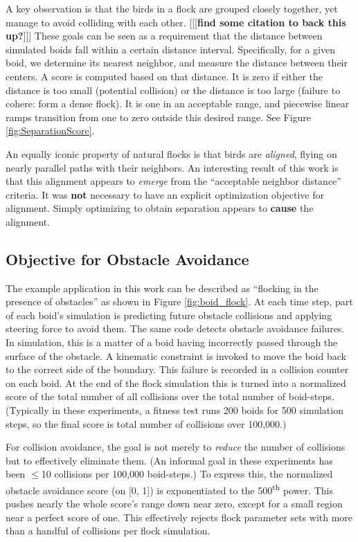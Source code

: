 \documentclass[letterpaper]{article}
\begin{document}
A key observation is that the birds in a flock are grouped closely together, yet manage to avoid colliding with each other. [[[\textbf{find some citation to back this up?}]]] These goals can be seen as a requirement that the distance between simulated boids fall within a certain distance interval. Specifically, for a given boid, we determine its nearest neighbor, and measure the distance between their centers. A score is computed based on that distance. It is zero if either the distance is too small (potential collision) or the distance is too large (failure to cohere: form a dense flock). It is one in an acceptable range, and piecewise linear ramps transition from one to zero outside this desired range. See Figure \ref{fig:SeparationScore}.

An equally iconic property of natural flocks is that birds are \textit{aligned}, flying on nearly parallel paths with their neighbors. An interesting result of this work is that this alignment appears to \textit{emerge} from the ``acceptable neighbor distance'' criteria. It was \textbf{not} necessary to have an explicit optimization objective for alignment. Simply optimizing to obtain separation appears to \textbf{cause} the alignment.

\subsection{Objective for Obstacle Avoidance}
\label{subsec:avoidance_objective}

The example application in this work can be described as ``flocking in the presence of obstacles'' as shown in Figure \ref{fig:boid_flock}. At each time step, part of each boid's simulation is predicting future obstacle collisions and applying steering force to avoid them. The same code detects obstacle avoidance failures. In simulation, this is a matter of a boid having incorrectly passed through the surface of the obstacle. A kinematic constraint is invoked to move the boid back to the correct side of the boundary. This failure is recorded in a collision counter on each boid. At the end of the flock simulation this is turned into a normalized score of the total number of all collisions over the total number of boid-steps. (Typically in these experiments, a fitness test runs 200 boids for 500 simulation steps, so the final score is total number of collisions over 100,000.) 

For collision avoidance, the goal is not merely to \textit{reduce} the number of collisions but to effectively eliminate them. (An informal goal in these experiments has been {$\leq$}10 collisions per 100,000 boid-steps.) To express this, the normalized obstacle avoidance score (on [0, 1]) is exponentiated to the 500\textsuperscript{th} power. This pushes nearly the whole score's range down near zero, except for a small region near a perfect score of one. This effectively rejects flock parameter sets with more than a handful of collisions per flock simulation.
\end{document}
